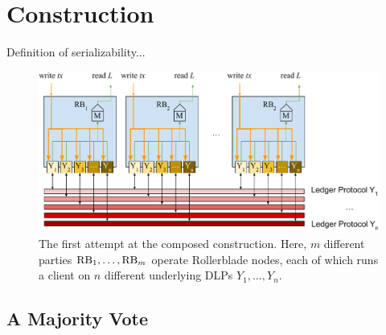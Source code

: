 \section{Construction}\label{sec:construction}

\begin{definition}[Serializability]
  Definition of serializability...
\end{definition}

\begin{figure}
    \centering
    \includegraphics[width=\textwidth,keepaspectratio]{figures/rollerblade-naive-construction.pdf}
    \caption{The first attempt at the composed construction. Here,
             $m$ different parties $\mathrm{RB}_1, \ldots, \mathrm{RB}_m$ operate Rollerblade
             nodes, each of which runs a client on $n$ different underlying
             DLPs $Y_1, \ldots, Y_n$.}
    \label{fig.naive}
\end{figure}

\subsection{A Majority Vote}\label{sec:construction-naive}

